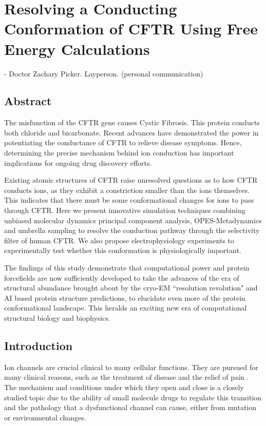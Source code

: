 \chapter{Resolving a Conducting Conformation of CFTR Using Free Energy Calculations}
\label{chap:opening}
 {- Doctor Zachary Picker. Layperson. (personal communication)}
\setcounter{figure}{0}
\renewcommand{\thefigure}{\arabic{chapter}.\arabic{figure}}


\section*{\centering Abstract} 
The misfunction of the CFTR gene causes Cystic Fibrosis. This protein conducts both chloride and bicarbonate. Recent advances have demonstrated the power in potentiating the conductance of CFTR to relieve disease symptoms. Hence, determining the precise mechanism behind ion conduction has important implications for ongoing drug discovery efforts. 

Existing atomic structures of CFTR raise unresolved questions as to how CFTR conducts ions, as they exhibit a constriction smaller than the ions themselves. This indicates that there must be some conformational changes for ions to pass through CFTR. Here we present innovative simulation techniques combining unbiased molecular dynamics principal component analysis, OPES-Metadynamics and umbrella sampling to resolve the conduction pathway through the selectivity filter of human CFTR. We also propose electrophysiology experiments to experimentally test whether this conformation is physiologically important.  

The findings of this study demonstrate that computational power and protein forcefields are now sufficiently developed to take the advances of the era of structural abundance brought about by the cryo-EM ``resolution revolution" and AI based protein structure predictions, to elucidate even more of the protein conformational landscape. This heralds an exciting new era of computational structural biology and biophysics.


\section{Introduction}

Ion channels are crucial clinical to many cellular functions. They are pursued for many clinical reasons, such as the treatment of disease and the relief of pain \cite{}. The mechanism and conditions under which they open and close is a closely studied topic due to the ability of small molecule drugs to regulate this transition and the pathology that a dysfunctional channel can cause, either from mutation or environmental changes.

